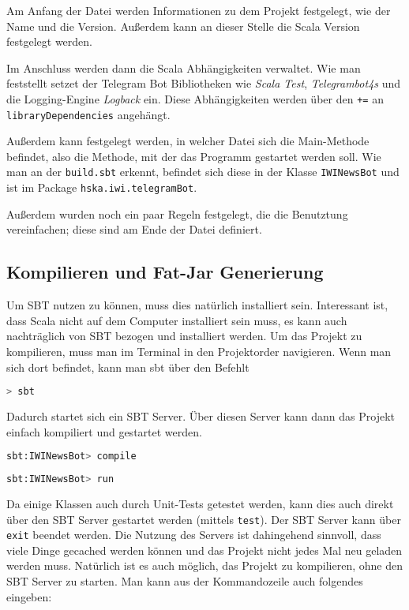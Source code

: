 

Am Anfang der Datei werden Informationen zu dem Projekt festgelegt, wie der Name und die Version. Außerdem kann an dieser Stelle die Scala Version festgelegt werden.

Im Anschluss werden dann die Scala Abhängigkeiten verwaltet. Wie man feststellt setzet der Telegram Bot Bibliotheken wie \emph{Scala Test}, \emph{Telegrambot4s} und die Logging-Engine \emph{Logback} ein. Diese Abhängigkeiten werden über den \texttt{+=} an \texttt{libraryDependencies} angehängt.

Außerdem kann festgelegt werden, in welcher Datei sich die Main-Methode befindet, also die Methode, mit der das Programm gestartet werden soll. Wie man an der \texttt{build.sbt} erkennt, befindet sich diese in der Klasse \texttt{IWINewsBot} und ist im Package \texttt{hska\allowbreak.iwi\allowbreak.telegramBot}.

Außerdem wurden noch ein paar Regeln festgelegt, die die Benutztung vereinfachen; diese sind am Ende der Datei definiert.

\subsection{Kompilieren und Fat-Jar Generierung}
Um SBT nutzen zu können, muss dies natürlich installiert sein. Interessant ist, dass Scala nicht auf dem Computer installiert sein muss, es kann auch nachträglich von SBT bezogen und installiert werden. Um das Projekt zu kompilieren, muss man im Terminal in den Projektorder navigieren. Wenn man sich dort befindet, kann man sbt über den Befehlt

\begin{lstlisting}[language=bash]
> sbt
\end{lstlisting}

Dadurch startet sich ein SBT Server. Über diesen Server kann dann das Projekt einfach kompiliert und gestartet werden.

\begin{lstlisting}[language=bash]
sbt:IWINewsBot> compile
\end{lstlisting}

\begin{lstlisting}[language=bash]
sbt:IWINewsBot> run
\end{lstlisting}

Da einige Klassen auch durch Unit-Tests getestet werden, kann dies auch direkt über den SBT Server gestartet werden (mittels \texttt{test}). Der SBT Server kann über \texttt{exit} beendet werden. Die Nutzung des Servers ist dahingehend sinnvoll, dass viele Dinge gecached werden können und das Projekt nicht jedes Mal neu geladen werden muss. Natürlich ist es auch möglich, das Projekt zu kompilieren, ohne den SBT Server zu starten. Man kann aus der Kommandozeile auch folgendes eingeben:


